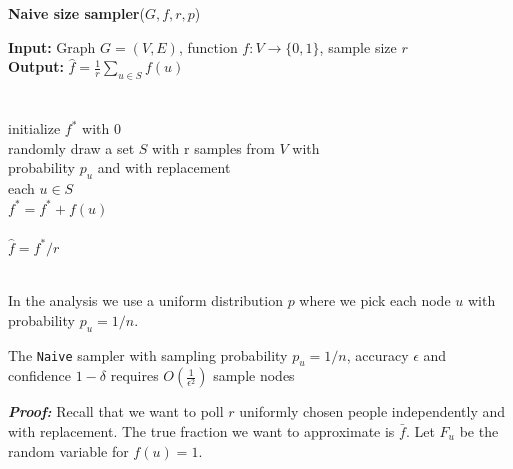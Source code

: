 \begin{algorithm*}[!htb]
  \caption{\small {\bf Naive size sampler}($G, f, r, p$)}
  \begin{code}
  {\bf Input:} Graph $G=(V,E)$, function $f : V \rightarrow \{0,1\}$, sample size $r$ \\
  {\bf Output:} $\hat{f}=\frac{1}{r}\sum\nolimits_{u\in S} f(u)$\\
  \\
  \uln \>\ubegin\\
  \uln \>\>initialize $f^*$ with 0 \\
  \uln \>\>randomly draw a set $S$ with r samples from $V$ with\\
  \>\>\>probability $p_u$ and with replacement\\
  \uln \>\>\ufor each $u \in S$ \udo\\
  \uln \>\>\>$f^* = f^* + f(u)$ \\
  \uln \>\>\uend\\
  \uln \>\ureturn $\hat{f} = f^*/r$ \\
  \uln \>\uend\\ 
  \end{code}
  \label{algnaive}
\end{algorithm*}
In the analysis we use a uniform distribution $p$ where we pick each node $u$ with probability $p_u = 1/n$.
\begin{theorem}
  The \texttt{Naive} sampler with sampling probability $p_u = 1/n$, accuracy $\epsilon$ and confidence $1-\delta$ requires $O(\frac{1}{\epsilon^2})$ sample nodes
\end{theorem}
\textbf{\textit{Proof: }}Recall that we want to poll $r$ uniformly chosen people independently and with replacement. The true fraction we want to approximate is $\bar{f}$. Let $F_u$ be the random variable for $f(u) = 1$.

